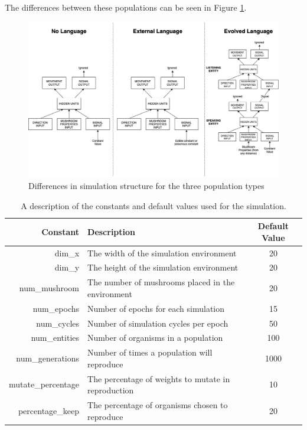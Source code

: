 \documentclass[12pt,a4paper,twoside,openright]{report}
\begin{document}
The differences between these populations can be seen in Figure \ref{fig:populations}.

\begin{figure}[t]
  \centering
  \includegraphics[width=.9\linewidth]{figs/populations}
  \caption{Differences in simulation structure for the three population types}
  \label{fig:populations}
\end{figure}

\begin{table}[t]
\centering
 \begin{tabular}{ r | l | c}
 \bf{Constant} & \bf{Description} & \bf{Default Value} \\ [0.5ex] 
 \hline
dim\_x & The width of the simulation environment & 20 \\
dim\_y & The height of the simulation environment & 20 \\
num\_mushroom & The number of mushrooms placed in the environment & 20 \\
num\_epochs &  Number of epochs for each simulation & 15 \\ 
num\_cycles & Number of simulation cycles per epoch & 50 \\
num\_entities & Number of organisms in a population & 100 \\
num\_generations & Number of times a population will reproduce & 1000 \\
mutate\_percentage & The percentage of weights to mutate in reproduction & 10 \\
percentage\_keep & The percentage of organisms chosen to reproduce & 20 \\
\end{tabular}
\caption{A description of the constants and default values used for the simulation.}
\label{table:constants}
\end{table}
\end{document}
